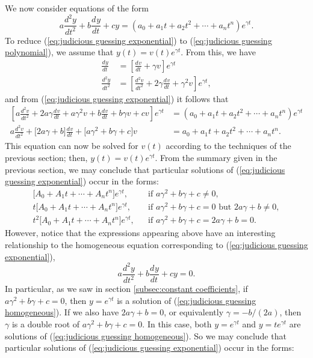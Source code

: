 \documentclass{myart}
\newcommand{\eq}[1]{(\ref{eq:#1})}
\newcommand{\deriv}[3][]{\frac{d^{#1}#2}{d#3^{#1}}}
\begin{document}
We now consider equations of the form
\begin{equation} \label{eq:judicious guessing exponential}
a \deriv[2]{y}{t} + b \deriv{y}{t} + cy = (a_0 + a_1t + a_2t^2 + \cdots + a_nt^n)e^{\gamma t}.
\end{equation}
To reduce \eq{judicious guessing exponential} to \eq{judicious guessing polynomial}, we assume that $y(t) = v(t) e^{\gamma t}$. From this, we have
\begin{align*}
\deriv{y}{t} &= \left[\deriv{v}{t} + \gamma v\right] e^{\gamma t} \\
\deriv[2]{y}{t} &= \left[\deriv[2]{v}{t} + 2\gamma \deriv{v}{t} + \gamma^2 v\right] e^{\gamma t},
\end{align*}
and from \eq{judicious guessing exponential} it follows that
\begin{align*}
\left[a \deriv[2]{v}{t} + 2a\gamma \deriv{v}{t} + a\gamma^2 v + b \deriv{v}{t} + b\gamma v + cv\right] e^{\gamma t} &= (a_0 + a_1t + a_2t^2 + \cdots + a_nt^n)e^{\gamma t} \\
a \deriv[2]{v}{t} + \big[2a\gamma + b\big] \deriv{v}{t} + \big[a\gamma^2 + b\gamma + c\big] v &= a_0 + a_1t + a_2t^2 + \cdots + a_nt^n.
\end{align*}
This equation can now be solved for $v(t)$ according to the techniques of the previous section; then, $y(t) = v(t)e^{\gamma t}$. From the summary given in the previous section, we may conclude that particular solutions of \eq{judicious guessing exponential} occur in the forms:
\begin{align*}
\Big[A_0 + A_1t + \cdots + A_nt^n\Big] e^{\gamma t}, && \text{if $a\gamma^2 + b\gamma + c \neq 0$}, \\
t\Big[A_0 + A_1t + \cdots + A_nt^n\Big] e^{\gamma t}, && \text{if $a\gamma^2 + b\gamma + c = 0$ but $2a\gamma + b \neq 0$}, \\
t^2\Big[A_0 + A_1t + \cdots + A_nt^n\Big] e^{\gamma t}, && \text{if $a\gamma^2 + b\gamma + c = 2a\gamma + b = 0$}.
\end{align*}
However, notice that the expressions appearing above have an interesting relationship to the homogeneous equation corresponding to \eq{judicious guessing exponential},
\begin{equation} \label{eq:judicious guessing homogeneous}
a \deriv[2]{y}{t} + b \deriv{y}{t} + cy = 0.
\end{equation}
In particular, as we saw in section \ref{subsec:constant coefficients}, if $a\gamma^2 + b\gamma + c = 0$, then $y = e^{\gamma t}$ is a solution of \eq{judicious guessing homogeneous}. If we also have $2a\gamma + b = 0$, or equivalently $\gamma = -b/(2a)$, then $\gamma$ is a double root of $a\gamma^2 + b\gamma + c = 0$. In this case, both $y = e^{\gamma t}$ and $y = te^{\gamma t}$ are solutions of \eq{judicious guessing homogeneous}. So we may conclude that particular solutions of \eq{judicious guessing exponential} occur in the forms:
\end{document}
